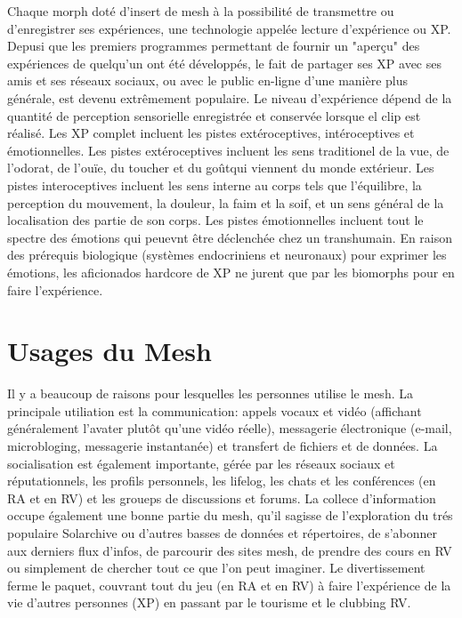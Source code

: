 Chaque morph doté d'insert de mesh à la possibilité de transmettre ou d'enregistrer ses expériences, une technologie appelée lecture d'expérience ou XP. Depusi que les premiers programmes permettant de fournir un "aperçu" des expériences de quelqu'un ont été développés, le fait de partager ses XP avec ses amis et ses réseaux sociaux, ou avec le public en-ligne d'une manière plus générale, est devenu extrêmement populaire. Le niveau d'expérience dépend de la quantité de perception sensorielle enregistrée et conservée lorsque el clip est réalisé. Les XP complet incluent les pistes extéroceptives, intéroceptives et émotionnelles. Les pistes extéroceptives incluent les sens traditionel de la vue, de l'odorat, de l'ouïe, du toucher et du goûtqui viennent du monde extérieur. Les pistes interoceptives incluent les sens interne au corps tels que l'équilibre, la perception du mouvement, la douleur, la faim et la soif, et un sens général de la localisation des partie de son corps. Les pistes émotionnelles incluent tout le spectre des émotions qui peuevnt être déclenchée chez un transhumain. En raison des prérequis biologique (systèmes endocriniens et neuronaux) pour exprimer les émotions, les aficionados hardcore de XP ne jurent que par les biomorphs pour en faire l'expérience. 

\section{Usages du Mesh} 

Il y a beaucoup de raisons pour lesquelles les personnes utilise le mesh. La principale utiliation est la communication: appels vocaux et vidéo (affichant généralement l'avater plutôt qu'une vidéo réelle), messagerie électronique (e-mail, microbloging, messagerie instantanée) et transfert de fichiers et de données. La socialisation est également importante, gérée par les réseaux sociaux et réputationnels, les profils personnels, les lifelog, les chats et les conférences (en RA et en RV) et les groueps de discussions et forums. La collece d'information occupe également une bonne partie du mesh, qu'il sagisse de l'exploration du trés populaire Solarchive ou d'autres basses de données et répertoires, de s'abonner aux derniers flux d'infos, de parcourir des sites mesh, de prendre des cours en RV ou simplement de chercher tout ce que l'on peut imaginer. Le divertissement ferme le paquet, couvrant tout du jeu (en RA et en RV) à faire l'expérience de la vie d'autres personnes (XP) en passant par le tourisme et le clubbing RV. 

